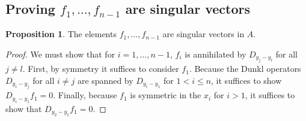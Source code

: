 \documentclass{amsart}
\numberwithin{equation}{section}
\theoremstyle{definition}
\newtheorem{proposition}[theorem]{Proposition}
\begin{document}
\subsection{Proving $f_1, \ldots, f_{n-1}$ are singular vectors} 

\begin{proposition}\label{prop:ann} 
The elements $f_1, \ldots, f_{n - 1}$ are singular vectors in $A$.
\end{proposition}
\begin{proof}
We must show that for $i = 1, \ldots, n - 1$, $f_i$ is annihilated by $D_{y_j - y_l}$ for all $j \ne l$.  First, by symmetry it suffices to consider $f_1$.  Because the Dunkl operators $D_{y_i-y_j}$ for all $i \ne j$ are spanned by $D_{y_i-y_1}$ for $1< i \le n$, it suffices to show $D_{y_i - y_1} f_1 = 0$.  Finally, because $f_1$ is symmetric in the $x_i$ for $i > 1$, it suffices to show that $D_{y_2 - y_1} f_1 = 0$.


\end{proof}
\end{document}
